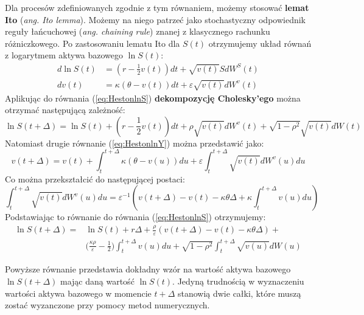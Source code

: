 \documentclass{pracamgr}
\begin{document}
Dla procesów zdefiniowanych zgodnie z tym równaniem, możemy 
stosować \textbf{lemat Ito} (\textit{ang. Ito lemma}). Możemy na niego patrzeć 
jako stochastyczny odpowiednik reguły łańcuchowej (\textit{ang. chaining rule}) znanej z 
klasycznego rachunku różniczkowego. 
Po zastosowaniu lematu Ito dla $S(t)$ otrzymujemy układ równań z logarytmem aktywa bazowego $\ln S(t)$:
\begin{subequations}
\begin{align}
d \ln S(t) &= \left( r - \frac{1}{2} v(t) \right) dt 
              + \sqrt{v(t)} SdW^S(t) \label{eq:HestonlnS} \\
dv(t)      &= \kappa (\theta - v(t))dt + \varepsilon 
              \sqrt{v(t)} dW^v(t)  \label{eq:HestonlnY}
\end{align} 
\end{subequations}
Aplikując do równania (\ref{eq:HestonlnS}) \textbf{dekompozycję Cholesky'ego} można
otrzymać następującą zależność:
\begin{equation}
  \ln S(t + \Delta) = \ln S(t) + \left( r - \frac{1}{2} v(t) \right) dt 
              + \rho \sqrt{v(t)} dW^v(t) + \sqrt{1 - \rho^2} \sqrt{v(t)} dW(t)
\end{equation}
Natomiast drugie równanie (\ref{eq:HestonlnY}) można przedstawić jako:
\begin{equation}
  v(t + \Delta)      = v(t) + \int_t^{t+\Delta} \kappa 
                        (\theta - v(u))du + \varepsilon 
                        \int_t^{t+\Delta}  \sqrt{v(t)} dW^v(u) du 
\end{equation}
Co można przekształcić do następującej postaci:
\begin{equation}
  \int_t^{t+\Delta}  \sqrt{v(t)} dW^v(u) du  = \varepsilon^{-1} \left(v(t+\Delta) 
  - v(t) - \kappa \theta \Delta + \kappa \int_t^{t+\Delta}  v(u) du \right)
\end{equation}
Podstawiając to równanie do równania (\ref{eq:HestonlnS}) otrzymujemy:
\begin{equation}
\begin{aligned}
\label{eq:HestonLnSDiscretization}
\ln S(t + \Delta) = & \ln S(t) + r \Delta + \frac{\rho}{\varepsilon} 
(v(t + \Delta)  - v(t) - \kappa \theta \Delta) + \\
& \Big( \frac{\kappa \rho}{\varepsilon} - \frac{1}{2} \Big)
\int_t^{t+\Delta} v(u) du + \sqrt{1-\rho^2} \int_t^{t+\Delta} \sqrt{v(u)}dW(u)
\end{aligned}
\end{equation}

Powyższe równanie przedstawia dokładny wzór na wartość aktywa 
bazowego $\ln S(t + \Delta) $ mając daną wartość $\ln S(t)$.
Jedyną trudnością w wyznaczeniu wartości aktywa bazowego w momencie
$t + \Delta$ stanowią dwie całki, które muszą zostać wyzanczone przy 
pomocy metod numerycznych. 
\end{document}
